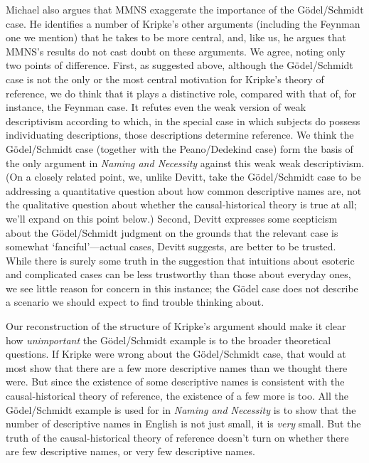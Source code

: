 Michael \citet{Devitt2010} also argues that MMNS exaggerate the importance of the G\"{o}del\-/\-Schmidt case. He identifies a number of Kripke's other arguments (including the Feynman one we mention) that he takes to be more central, and, like us, he argues that MMNS's results do not cast doubt on these arguments. We agree, noting only two points of difference. First, as suggested above, although the G\"{o}del\-/\-Schmidt case is not the only or the most central motivation for Kripke's theory of reference, we do think that it plays a distinctive role, compared with that of, for instance, the Feynman case. It refutes even the weak version of weak descriptivism according to which, in the special case in which subjects do possess individuating descriptions, those descriptions determine reference. We think the G\"{o}del\-/\-Schmidt case (together with the Peano/Dedekind case) form the basis of the only argument in \textit{Naming and Necessity} against this weak weak descriptivism. (On a closely related point, we, unlike Devitt, take the G\"{o}del\-/\-Schmidt case to be addressing a quantitative question about how common descriptive names are, not the qualitative question about whether the causal-historical theory is true at all; we'll expand on this point below.) Second, Devitt expresses some scepticism about the G\"{o}del\-/\-Schmidt judgment on the grounds that the relevant case is somewhat `fanciful'---actual cases, Devitt suggests, are better to be trusted. While there is surely some truth in the suggestion that intuitions about esoteric and complicated cases can be less trustworthy than those about everyday ones, we see little reason for concern in this instance; the G\"{o}del case does not describe a scenario we should expect to find trouble thinking about.

Our reconstruction of the structure of Kripke's argument should make it clear how \textit{unimportant} the G\"{o}del\-/\-Schmidt example is to the broader theoretical questions. If Kripke were wrong about the G\"{o}del\-/\-Schmidt case, that would at most show that there are a few more descriptive names than we thought there were. But since the existence of some descriptive names is consistent with the causal-historical theory of reference, the existence of a few more is too. All the G\"{o}del\-/\-Schmidt example is used for in \textit{Naming and Necessity} is to show that the number of descriptive names in English is not just small, it is \textit{very} small. But the truth of the causal-historical theory of reference doesn't turn on whether there are few descriptive names, or very few descriptive names.

